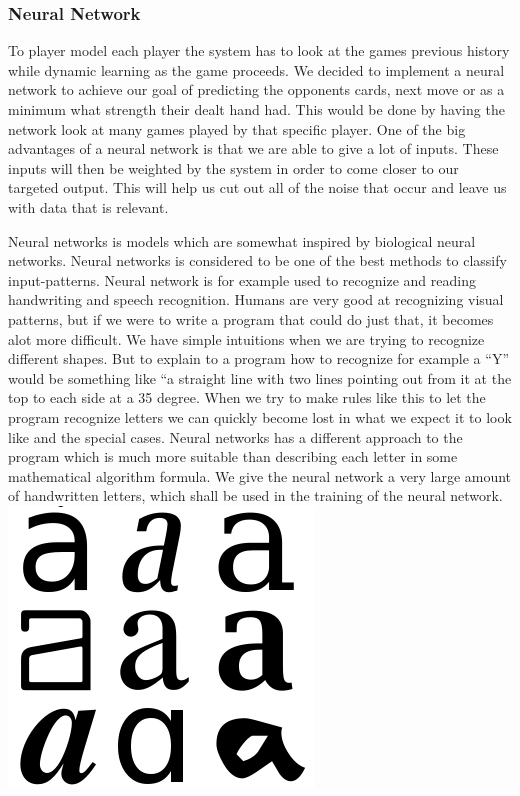 \subsubsection{Neural Network}
To player model each player the system has to look at the games previous history while dynamic learning as the game proceeds.
We decided to implement a neural network to achieve our goal of predicting the opponents cards, next move or as a minimum what strength their dealt hand had. This would be done by having the network look at many games played by that specific player.
One of the big advantages of a neural network is that we are able to give a lot of inputs. These inputs will then be weighted by the system in order to come closer to our targeted output.
This will help us cut out all of the noise that occur and leave us with data that is relevant.

Neural networks is models which are somewhat inspired by biological neural networks. Neural networks is considered to be one of the best methods to classify input-patterns. Neural network is for example used to recognize and reading handwriting and speech recognition.
Humans are very good at recognizing visual patterns, but if we were to write a program that could do just that, it becomes alot more difficult. We have simple intuitions when we are trying to recognize different shapes. But to explain to a program how to recognize for example a “Y” would be something like “a straight line with two lines pointing out from it at the top to each side at a 35 degree. When we try to make rules like this to let the program recognize letters we can quickly become lost in what we expect it to look like and the special cases.
Neural networks has a different approach to the program which is much more suitable than describing each letter in some mathematical algorithm formula.
We give the neural network a very large amount of handwritten letters, which shall be used in the training of the neural network.
\includegraphics[scale=0.5]{images/nn.png}


